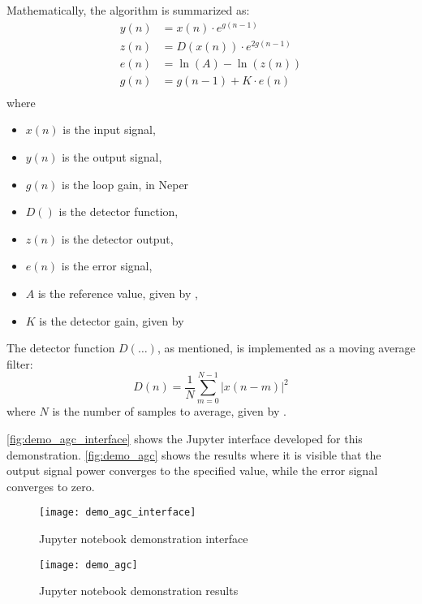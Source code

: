 Mathematically, the algorithm is summarized as:
\begin{align}
y(n) & = x(n)\cdot e^{g(n-1)}\\
z(n) & = D(x(n))\cdot e^{2g(n-1)}\\
e(n) & = \ln(A)-\ln(z(n))\\
g(n) & = g(n-1)+K\cdot e(n)\\
\end{align}
where
\begin{itemize}
  \item $x(n)$ is the input signal,
  \item $y(n)$ is the output signal,
  \item $g(n)$ is the loop gain, in Neper
  \item $D()$ is the detector function,
  \item $z(n)$ is the detector output,
  \item $e(n)$ is the error signal,
  \item $A$ is the reference value, given by ,
  \item $K$ is the detector gain, given by 
\end{itemize}

The detector function $D(\ldots)$, as mentioned, is implemented as a moving average filter:
\begin{equation}D(n)=\frac{1}{N}\sum_{m=0}^{N-1}|x(n-m)|^2\end{equation}
where $N$ is the number of samples to average, given by .

\autoref{fig:demo_agc_interface} shows the Jupyter interface developed for this demonstration. \autoref{fig:demo_agc} shows the results where it is visible that the output signal power converges to the specified value, while the error signal converges to zero.

\begin{figure}[H]
  \centering
  \texttt{[image: demo\_agc\_interface]}
  \caption{ Jupyter notebook demonstration interface}
  \label{fig:demo_agc_interface}
\end{figure}

\begin{figure}[H]
  \centering
  \texttt{[image: demo\_agc]}
  \caption{ Jupyter notebook demonstration results}
  \label{fig:demo_agc}
\end{figure}

